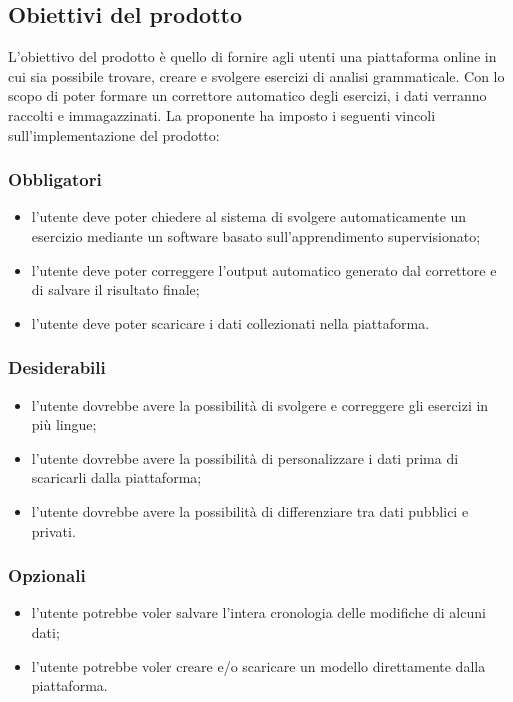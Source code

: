 \subsection{Obiettivi del prodotto}
	L'obiettivo del prodotto è quello di fornire agli utenti una piattaforma online in cui sia possibile trovare, creare e svolgere esercizi di analisi grammaticale. 
Con lo scopo di poter formare un correttore automatico degli esercizi, i dati verranno raccolti e immagazzinati. 
La proponente ha imposto i seguenti vincoli sull'implementazione del prodotto:

\subsubsection{Obbligatori}
\begin{itemize}
	\item l'utente deve poter chiedere al sistema di svolgere automaticamente un esercizio mediante un software basato sull'apprendimento supervisionato;
	\item l'utente deve poter correggere l'output automatico generato dal correttore e di salvare il risultato finale;
	\item l'utente deve poter scaricare i dati collezionati nella piattaforma.
\end{itemize}
\subsubsection{Desiderabili}
\begin{itemize}
	\item l'utente dovrebbe avere la possibilità di svolgere e correggere gli esercizi in più lingue;
	\item l'utente dovrebbe avere la possibilità di personalizzare i dati prima di scaricarli dalla piattaforma;
	\item l'utente dovrebbe avere la possibilità di differenziare tra dati pubblici e privati.
\end{itemize}
\subsubsection{Opzionali}
\begin{itemize}
	\item l'utente potrebbe voler salvare l'intera cronologia delle modifiche di alcuni dati;
	\item l'utente potrebbe voler creare e/o scaricare un modello direttamente dalla piattaforma.
\end{itemize}
